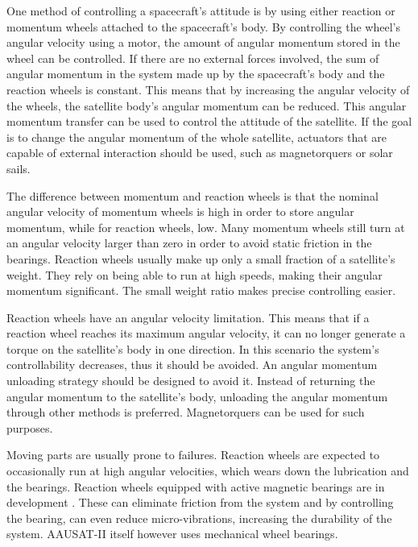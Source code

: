 One method of controlling a spacecraft's attitude is by using either reaction or momentum wheels attached to the spacecraft's body. By controlling the wheel's angular velocity using a motor, the amount of angular momentum stored in the wheel can be controlled. If there are no external forces involved, the sum of angular momentum in the system made up by the spacecraft's body and the reaction wheels is constant. This means that by increasing the angular velocity of the wheels, the satellite body's angular momentum can be reduced. This angular momentum transfer can be used to control the attitude of the satellite. If the goal is to change the angular momentum of the whole satellite, actuators that are capable of external interaction should be used, such as magnetorquers or solar sails.

The difference between momentum and reaction wheels is that the nominal angular velocity of momentum wheels is high in order to store angular momentum, while for reaction wheels, low. Many momentum wheels still turn at an angular velocity larger than zero in order to avoid static friction in the bearings. Reaction wheels usually make up only a small fraction of a satellite's weight. They rely on being able to run at high speeds, making their angular momentum significant. The small weight ratio makes precise controlling easier.




Reaction wheels have an angular velocity limitation. This means that if a reaction wheel reaches its maximum angular velocity, it can no longer generate a torque on the satellite's body in one direction. In this scenario the system's controllability decreases, thus it should be avoided. An angular momentum unloading strategy should be designed to avoid it. Instead of returning the angular momentum to the satellite's body, unloading the angular momentum through other methods is preferred. Magnetorquers can be used for such purposes.

Moving parts are usually prone to failures. Reaction wheels are expected to occasionally run at high angular velocities, which wears down the lubrication and the bearings. Reaction wheels equipped with active magnetic bearings are in development \cite{MagneticReactWheel}. These can eliminate friction from the system and by controlling the bearing, can even reduce micro-vibrations, increasing the durability of the system. AAUSAT-II itself however uses mechanical wheel bearings.



